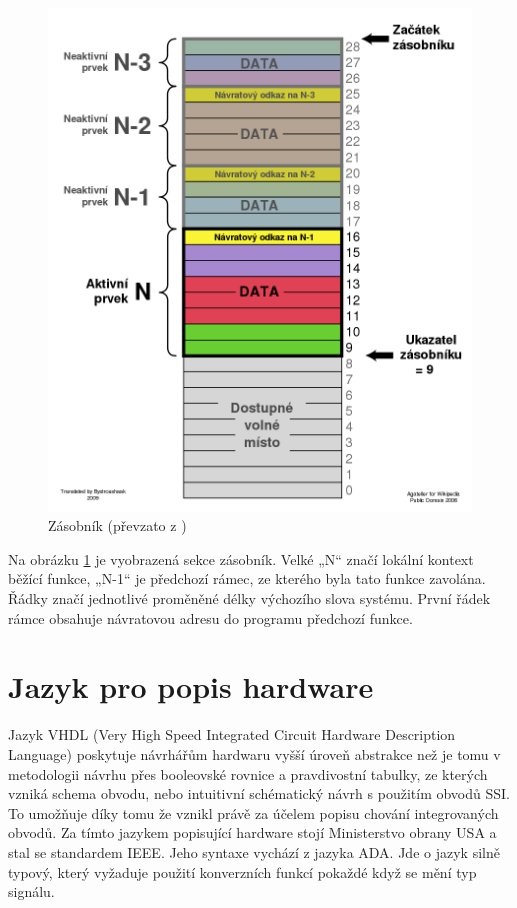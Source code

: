 \documentclass[FM,BP]{tulthesis}
\begin{document}
\begin{figure}[h]
    \includegraphics[scale=0.3]{assets/ProgramCallStack.png}
    \centering
    \caption{Zásobník (převzato z \cite{wiki_zasobnik})}
    \label{img:Stack}
\end{figure}

Na obrázku \ref{img:Stack} je vyobrazená sekce zásobník. Velké „N“ značí lokální kontext běžící funkce, „N-1“ je předchozí rámec, ze kterého byla tato funkce zavolána. Řádky značí jednotlivé proměněné délky výchozího slova systému. První řádek rámce obsahuje návratovou adresu do programu předchozí funkce. 

\newpage

\section{Jazyk pro popis hardware}
Jazyk VHDL (Very High Speed Integrated Circuit Hardware Description Language) poskytuje návrhářům hardwaru vyšší úroveň abstrakce než je tomu v metodologii návrhu přes booleovské rovnice a pravdivostní tabulky, ze kterých vzniká schema obvodu, nebo intuitivní schématický návrh s použitím obvodů SSI. To umožňuje díky tomu že vznikl právě za účelem popisu chování integrovaných obvodů. Za tímto jazykem popisující hardware stojí Ministerstvo obrany USA a stal se standardem IEEE. Jeho syntaxe vychází z jazyka ADA. Jde o jazyk silně typový, který vyžaduje použití konverzních funkcí pokaždé když se mění typ signálu. 
\end{document}
